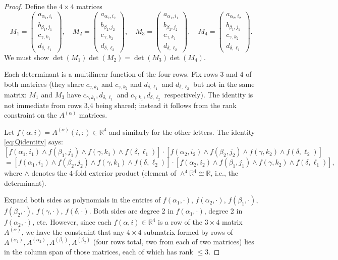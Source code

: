 \documentclass[12pt]{article}
\theoremstyle{definition}
\newcommand{\R}{\mathbb{R}}
\begin{document}
\begin{proof}
Define the $4\times 4$ matrices
\[
M_1 = \begin{pmatrix}a_{\alpha_1,i_1}\\ b_{\beta_1,j_1}\\ c_{\gamma,k_1}\\ d_{\delta,\ell_1}\end{pmatrix}, \quad
M_2 = \begin{pmatrix}a_{\alpha_2,i_2}\\ b_{\beta_2,j_2}\\ c_{\gamma,k_2}\\ d_{\delta,\ell_2}\end{pmatrix}, \quad
M_3 = \begin{pmatrix}a_{\alpha_1,i_1}\\ b_{\beta_2,j_2}\\ c_{\gamma,k_1}\\ d_{\delta,\ell_2}\end{pmatrix}, \quad
M_4 = \begin{pmatrix}a_{\alpha_2,i_2}\\ b_{\beta_1,j_1}\\ c_{\gamma,k_2}\\ d_{\delta,\ell_1}\end{pmatrix}.
\]
We must show $\det(M_1)\det(M_2) = \det(M_3)\det(M_4)$.

Each determinant is a multilinear function of the four rows. Fix rows 3 and 4 of both matrices (they share $c_{\gamma,k_1}$ and $c_{\gamma,k_2}$ and $d_{\delta,\ell_1}$ and $d_{\delta,\ell_2}$ but not in the same matrix: $M_1$ and $M_3$ have $c_{\gamma,k_1},d_{\delta,\ell_1}$ and $c_{\gamma,k_1},d_{\delta,\ell_2}$ respectively). The identity is not immediate from rows 3,4 being shared; instead it follows from the rank constraint on the $A^{(\alpha)}$ matrices.

Let $f(\alpha,i) = A^{(\alpha)}(i,:) \in \R^4$ and similarly for the other letters. The identity \eqref{eq:Qidentity} says:
\[
[f(\alpha_1,i_1)\wedge f(\beta_1,j_1)\wedge f(\gamma,k_1)\wedge f(\delta,\ell_1)]\cdot[f(\alpha_2,i_2)\wedge f(\beta_2,j_2)\wedge f(\gamma,k_2)\wedge f(\delta,\ell_2)]
\]
\[
= [f(\alpha_1,i_1)\wedge f(\beta_2,j_2)\wedge f(\gamma,k_1)\wedge f(\delta,\ell_2)]\cdot[f(\alpha_2,i_2)\wedge f(\beta_1,j_1)\wedge f(\gamma,k_2)\wedge f(\delta,\ell_1)],
\]
where $\wedge$ denotes the $4$-fold exterior product (element of $\wedge^4\R^4 \cong \R$, i.e., the determinant).

Expand both sides as polynomials in the entries of $f(\alpha_1,\cdot)$, $f(\alpha_2,\cdot)$, $f(\beta_1,\cdot)$, $f(\beta_2,\cdot)$, $f(\gamma,\cdot)$, $f(\delta,\cdot)$. Both sides are degree 2 in $f(\alpha_1,\cdot)$, degree 2 in $f(\alpha_2,\cdot)$, etc. However, since each $f(\alpha,i) \in \R^4$ is a row of the $3\times 4$ matrix $A^{(\alpha)}$, we have the constraint that any $4\times 4$ submatrix formed by rows of $A^{(\alpha_1)}, A^{(\alpha_2)}, A^{(\beta_1)}, A^{(\beta_2)}$ (four rows total, two from each of two matrices) lies in the column span of those matrices, each of which has rank $\leq 3$.


\end{proof}
\end{document}
